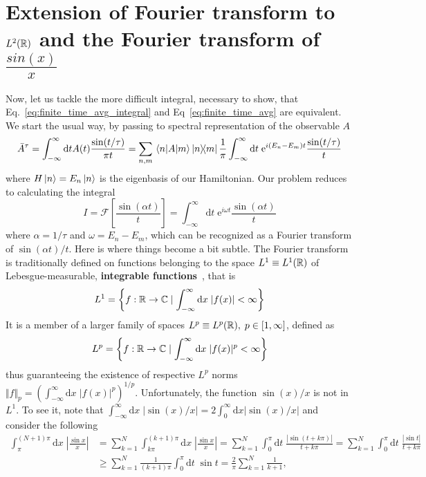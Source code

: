 \section{Extension of Fourier transform to \(L^2(\mathbb{R})\) and the Fourier transform of \(\frac{sin(x)}{x}\)}
Now, let us tackle the more difficult integral, necessary to show, that Eq.~\eqref{eq:finite_time_avg_integral}
and Eq~\eqref{eq:finite_time_avg} are equivalent. We start the usual way, by passing to spectral representation
of the observable \(A\)
\begin{equation}
    \bar{A}^{\tau} = \int_{-\infty}^{\infty} \mathrm{d}t A(t) \frac{\sin (t/\tau )}{\pi t}
    = \sum_{n,m}  \matrixel{n}{A}{m} \ketbra{n}{m} \frac{1}{\pi } \int_{-\infty}^{\infty} \mathrm{d}t\;
    \mathrm{e}^{i (E_n-E_m) t} \frac{\sin (t/\tau )}{t}
\end{equation}
where \(H\ket{n} = E_n \ket{n}\) is the eigenbasis of our Hamiltonian. Our problem reduces to calculating
the integral
\begin{equation}
    I =\mathcal{F}\left[ \frac{\sin (\alpha t)}{t} \right]=  \int_{-\infty}^{\infty} \mathrm{d}t\; \mathrm{e}^{i \omega  t} \frac{\sin (\alpha  t )}{t}
\end{equation}
where \(\alpha = 1/\tau\) and \(\omega = E_n-E_m\), which can be recognized as a Fourier transform of
\(\sin (\alpha  t )/t\). Here is where things become a bit subtle. The Fourier transform is traditionally
defined on functions belonging to the space \(L^1 \equiv L^1(\mathbb{R})\) of Lebesgue-measurable, \textbf{integrable
    functions}~\autocite{Rudin1987}, that is
\begin{equation}
    L^1 = \left\{f:\mathbb{R} \to \mathbb{C} \mid \int_{-\infty}^{\infty} \mathrm{d}x \; |f(x)| < \infty \right\}
\end{equation}
It is a member of a larger family of spaces \(L^p \equiv L^p(\mathbb{R}),\; p \in \left[ 1,\infty  \right] \), defined as
\begin{equation}
    L^p = \left\{f:\mathbb{R} \to \mathbb{C} \mid \int_{-\infty}^{\infty} \mathrm{d}x \; |f(x)|^p < \infty \right\}
\end{equation}
thus guaranteeing the existence of respective \(L^p\) norms \(\Vert f \Vert_p = \left(\int_{-\infty}^{\infty} \mathrm{d}x \; |f(x)|^p \right)^{1/p}\).
Unfortunately, the function \(\sin (x)/x\) is not in \(L^1\). To see it, note that
\(\int_{-\infty}^{\infty} \mathrm{d}x\; \vert \sin (x)/x \vert = 2 \int_{0}^{\infty} \mathrm{d}x \vert \sin (x)/x \vert  \)
and consider the following
\begin{align*}
    \int_{\pi}^{(N+1)\pi}\mathrm{d}x\;  \left|\frac{\sin x}x\right| & =\sum_{k=1}^N\int_{k\pi}^{(k+1)\pi}\mathrm{d}x \;\left|\frac{\sin x}x\right|
    =\sum_{k=1}^N\int_0^{\pi}\mathrm{d}t \;\frac{|\sin(t+k\pi)|}{t+k\pi}
    =\sum_{k=1}^N\int_0^{\pi}\mathrm{d}t \;\frac{|\sin t|}{t+k\pi}                                                                                 \\\
                                                                    & \geq \sum_{k=1}^N\frac 1{(k+1)\pi}\int_0^{\pi}\mathrm{d}t\;  \sin t
    =\frac 2{\pi}\sum_{k=1}^N\frac 1{k+1},
\end{align*}
